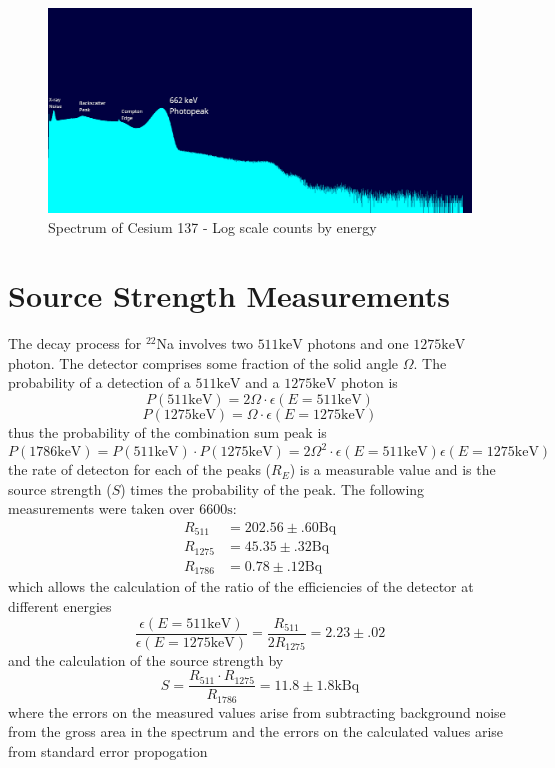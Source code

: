 \documentclass[12pt, a4paper]{article}
\begin{document}
	\begin{figure}[H] \centering
		\includegraphics[scale=0.3]{assets/cs137_log_annotated.png}
		\caption{Spectrum of Cesium 137 - Log scale counts by energy}
	\end{figure}

\section{Source Strength Measurements}
	The decay process for $^{22}$Na involves two $511\unit{\keV}$ photons and one $1275\unit{\keV}$ photon. The detector comprises some fraction of the solid angle $\Omega$. The probability of a detection of a $511\unit{\keV}$ and a $1275\unit{\keV}$ photon is
	\begin{equation}
		P(511\unit{\keV}) = 2\Omega\cdot\epsilon(E=511\unit{\keV})
	\end{equation}
	\begin{equation}
		P(1275\unit{\keV}) = \Omega\cdot\epsilon(E=1275\unit{\keV})
	\end{equation}
	thus the probability of the combination sum peak is
	\begin{equation}
		P(1786\unit{\keV}) = P(511\unit{\keV})\cdot P(1275\unit{\keV}) = 2\Omega^2\cdot\epsilon(E=511\unit{\keV})\epsilon(E=1275\unit{\keV})
	\end{equation}
	the rate of detecton for each of the peaks ($R_E$) is a measurable value and is the source strength ($S$) times the probability of the peak. The following measurements were taken over $6600\unit{\s}$:
	\begin{align}
		R_{511} &= 202.56\pm.60\unit{\becquerel}\\
		R_{1275} &= 45.35\pm.32\unit{\becquerel}\\
		R_{1786} &= 0.78\pm.12\unit{\becquerel}
	\end{align}
	which allows the calculation of the ratio of the efficiencies of the detector at different energies
	\begin{equation}
		\frac{\epsilon(E=511\unit{\keV})}{\epsilon(E=1275\unit{\keV})} = \frac{R_{511}}{2R_{1275}} = 2.23\pm.02
	\end{equation}
	and the calculation of the source strength by
	\begin{equation}
		S = \frac{R_{511}\cdot R_{1275}}{R_{1786}} = 11.8\pm1.8\unit{\kilo\becquerel}
	\end{equation}
	where the errors on the measured values arise from subtracting background noise from the gross area in the spectrum and the errors on the calculated values arise from standard error propogation
\end{document}
